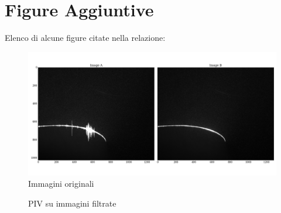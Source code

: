 \documentclass[a4paper]{article}
\begin{document}
\clearpage


\section{Figure Aggiuntive}

Elenco di alcune figure citate nella relazione:

\begin{figure}[ht]
	\centering
	\includegraphics[width=1\textwidth]{images/raw_images.png}
	\caption{Immagini originali}
	\label{fig:img}
\end{figure}


 \begin{figure}[ht]
 	\centering
 	\caption{PIV su immagini filtrate}
 	\label{fig:filt_piv}
 \end{figure}
\end{document}
